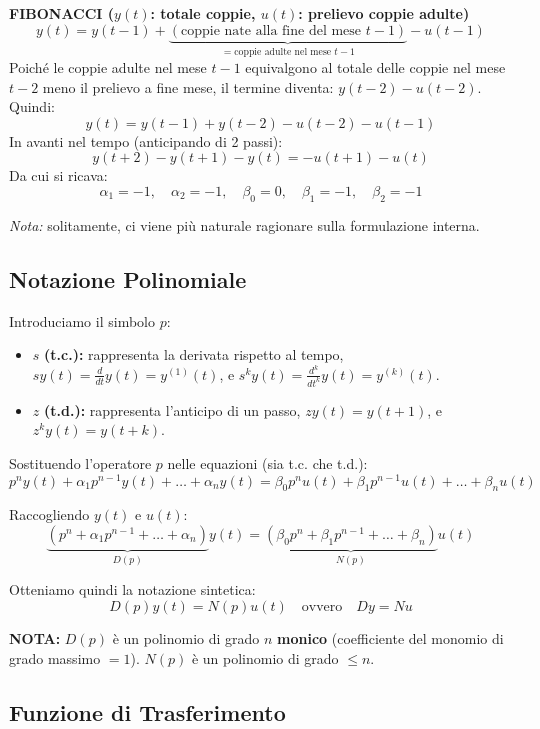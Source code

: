 \documentclass[11pt,a4paper]{article}
\begin{document}
\noindent
\textbf{FIBONACCI ($y(t)$: totale coppie, $u(t)$: prelievo coppie adulte)}
$$ y(t) = y(t-1) + \underbrace{(\text{coppie nate alla fine del mese } t-1)}_{= \text{coppie adulte nel mese } t-1} - u(t-1) $$
Poiché le coppie adulte nel mese $t-1$ equivalgono al totale delle coppie nel mese $t-2$ meno il prelievo a fine mese, il termine diventa: $y(t-2) - u(t-2)$.
Quindi:
$$ y(t) = y(t-1) + y(t-2) - u(t-2) - u(t-1) $$
In avanti nel tempo (anticipando di 2 passi):
$$ y(t+2) - y(t+1) - y(t) = -u(t+1) - u(t) $$
Da cui si ricava:
$$ \alpha_1 = -1, \quad \alpha_2 = -1, \quad \beta_0 = 0, \quad \beta_1 = -1, \quad \beta_2 = -1 $$

\textit{Nota:} solitamente, ci viene più naturale ragionare sulla formulazione interna.

\subsection{Notazione Polinomiale}

Introduciamo il simbolo $p$:
\begin{itemize}
    \item $s$ \textbf{(t.c.):} rappresenta la derivata rispetto al tempo, $s y(t) = \frac{d}{dt}y(t) = y^{(1)}(t)$, e $s^k y(t) = \frac{d^k}{dt^k}y(t) = y^{(k)}(t)$.
    \item $z$ \textbf{(t.d.):} rappresenta l'anticipo di un passo, $z y(t) = y(t+1)$, e $z^k y(t) = y(t+k)$.
\end{itemize}

Sostituendo l'operatore $p$ nelle equazioni (sia t.c. che t.d.):
$$ p^n y(t) + \alpha_1 p^{n-1} y(t) + \dots + \alpha_n y(t) = \beta_0 p^n u(t) + \beta_1 p^{n-1} u(t) + \dots + \beta_n u(t) $$

Raccogliendo $y(t)$ e $u(t)$:
$$ \underbrace{(p^n + \alpha_1 p^{n-1} + \dots + \alpha_n)}_{D(p)} y(t) = \underbrace{(\beta_0 p^n + \beta_1 p^{n-1} + \dots + \beta_n)}_{N(p)} u(t) $$

Otteniamo quindi la notazione sintetica:
$$ D(p) y(t) = N(p) u(t) \quad \text{ovvero} \quad Dy = Nu $$

\textbf{NOTA:} $D(p)$ è un polinomio di grado $n$ \textbf{monico} (coefficiente del monomio di grado massimo $= 1$). $N(p)$ è un polinomio di grado $\le n$.

\subsection{Funzione di Trasferimento}
\end{document}
